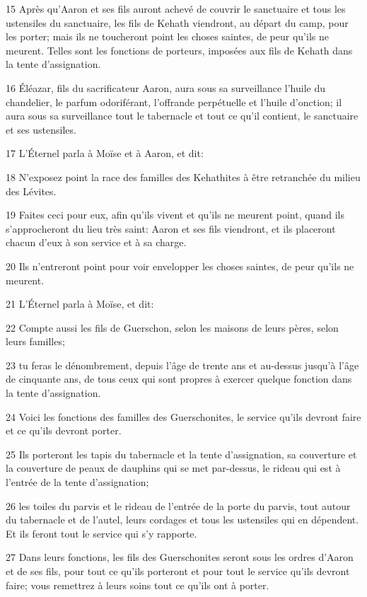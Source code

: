\par 15 Après qu'Aaron et ses fils auront achevé de couvrir le sanctuaire et tous les ustensiles du sanctuaire, les fils de Kehath viendront, au départ du camp, pour les porter; mais ils ne toucheront point les choses saintes, de peur qu'ils ne meurent. Telles sont les fonctions de porteurs, imposées aux fils de Kehath dans la tente d'assignation.
\par 16 Éléazar, fils du sacrificateur Aaron, aura sous sa surveillance l'huile du chandelier, le parfum odoriférant, l'offrande perpétuelle et l'huile d'onction; il aura sous sa surveillance tout le tabernacle et tout ce qu'il contient, le sanctuaire et ses ustensiles.
\par 17 L'Éternel parla à Moïse et à Aaron, et dit:
\par 18 N'exposez point la race des familles des Kehathites à être retranchée du milieu des Lévites.
\par 19 Faites ceci pour eux, afin qu'ils vivent et qu'ils ne meurent point, quand ils s'approcheront du lieu très saint: Aaron et ses fils viendront, et ils placeront chacun d'eux à son service et à sa charge.
\par 20 Ils n'entreront point pour voir envelopper les choses saintes, de peur qu'ils ne meurent.
\par 21 L'Éternel parla à Moïse, et dit:
\par 22 Compte aussi les fils de Guerschon, selon les maisons de leurs pères, selon leurs familles;
\par 23 tu feras le dénombrement, depuis l'âge de trente ans et au-dessus jusqu'à l'âge de cinquante ans, de tous ceux qui sont propres à exercer quelque fonction dans la tente d'assignation.
\par 24 Voici les fonctions des familles des Guerschonites, le service qu'ils devront faire et ce qu'ils devront porter.
\par 25 Ils porteront les tapis du tabernacle et la tente d'assignation, sa couverture et la couverture de peaux de dauphins qui se met par-dessus, le rideau qui est à l'entrée de la tente d'assignation;
\par 26 les toiles du parvis et le rideau de l'entrée de la porte du parvis, tout autour du tabernacle et de l'autel, leurs cordages et tous les ustensiles qui en dépendent. Et ils feront tout le service qui s'y rapporte.
\par 27 Dans leurs fonctions, les fils des Guerschonites seront sous les ordres d'Aaron et de ses fils, pour tout ce qu'ils porteront et pour tout le service qu'ils devront faire; vous remettrez à leurs soins tout ce qu'ils ont à porter.
